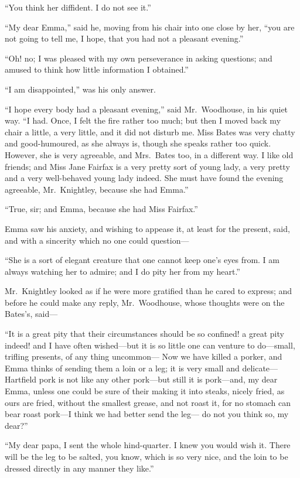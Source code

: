 ``You think her diffident.  I do not see it.''

``My dear Emma,'' said he, moving from his chair into one close
by her, ``you are not going to tell me, I hope, that you
had not a pleasant evening.''

``Oh! no; I was pleased with my own perseverance in asking questions;
and amused to think how little information I obtained.''

``I am disappointed,'' was his only answer.

``I hope every body had a pleasant evening,'' said Mr.\ Woodhouse,
in his quiet way.  ``I had.  Once, I felt the fire rather too much;
but then I moved back my chair a little, a very little, and it did
not disturb me.  Miss Bates was very chatty and good-humoured,
as she always is, though she speaks rather too quick.  However,
she is very agreeable, and Mrs.\ Bates too, in a different way.
I like old friends; and Miss Jane Fairfax is a very pretty sort of
young lady, a very pretty and a very well-behaved young lady indeed.
She must have found the evening agreeable, Mr.\ Knightley, because she
had Emma.''

``True, sir; and Emma, because she had Miss Fairfax.''

Emma saw his anxiety, and wishing to appease it, at least for
the present, said, and with a sincerity which no one could question---%

``She is a sort of elegant creature that one cannot keep one's eyes from.
I am always watching her to admire; and I do pity her from my heart.''

Mr.\ Knightley looked as if he were more gratified than he cared
to express; and before he could make any reply, Mr.\ Woodhouse,
whose thoughts were on the Bates's, said---%

``It is a great pity that their circumstances should be so confined!
a great pity indeed! and I have often wished---but it is so little one
can venture to do---small, trifling presents, of any thing uncommon---%
Now we have killed a porker, and Emma thinks of sending them
a loin or a leg; it is very small and delicate---Hartfield pork is
not like any other pork---but still it is pork---and, my dear Emma,
unless one could be sure of their making it into steaks, nicely fried,
as ours are fried, without the smallest grease, and not roast it,
for no stomach can bear roast pork---I think we had better send the leg---%
do not you think so, my dear?''

``My dear papa, I sent the whole hind-quarter. I knew you would wish it.
There will be the leg to be salted, you know, which is so very nice,
and the loin to be dressed directly in any manner they like.''

